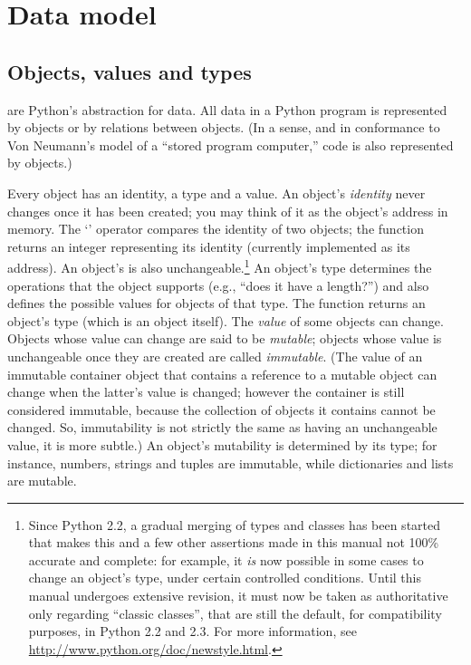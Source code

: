 \chapter{Data model\label{datamodel}}


\section{Objects, values and types\label{objects}}

 are Python's abstraction for data.  All data in a Python
program is represented by objects or by relations between objects.
(In a sense, and in conformance to Von Neumann's model of a
``stored program computer,'' code is also represented by objects.)

Every object has an identity, a type and a value.  An object's
\emph{identity} never changes once it has been created; you may think
of it as the object's address in memory.  The `' operator
compares the identity of two objects; the
 function returns an integer
representing its identity (currently implemented as its address).
An object's  is
also unchangeable.\footnote{Since Python 2.2, a gradual merging of
types and classes has been started that makes this and a few other
assertions made in this manual not 100\% accurate and complete:
for example, it \emph{is} now possible in some cases to change an
object's type, under certain controlled conditions.  Until this manual
undergoes extensive revision, it must now be taken as authoritative
only regarding ``classic classes'', that are still the default, for
compatibility purposes, in Python 2.2 and 2.3.  For more information,
see \url{http://www.python.org/doc/newstyle.html}.}
An object's type determines the operations that the object
supports (e.g., ``does it have a length?'') and also defines the
possible values for objects of that type.  The
 function returns an object's type
(which is an object itself).  The \emph{value} of some
objects can change.  Objects whose value can change are said to be
\emph{mutable}; objects whose value is unchangeable once they are
created are called \emph{immutable}.
(The value of an immutable container object that contains a reference
to a mutable object can change when the latter's value is changed;
however the container is still considered immutable, because the
collection of objects it contains cannot be changed.  So, immutability
is not strictly the same as having an unchangeable value, it is more
subtle.)
An object's mutability is determined by its type; for instance,
numbers, strings and tuples are immutable, while dictionaries and
lists are mutable.

